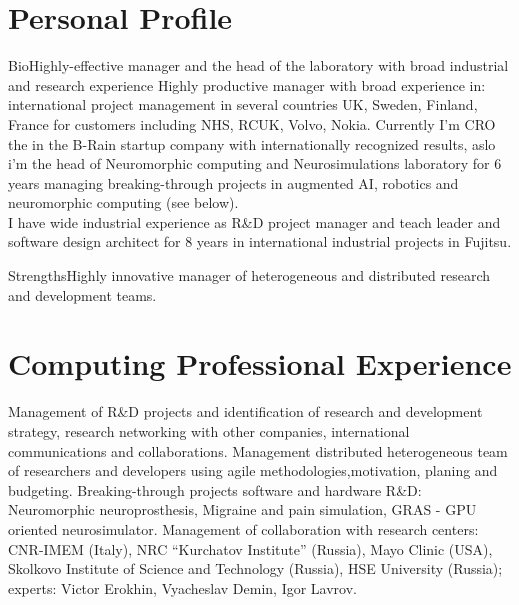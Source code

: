 \documentclass{moderncv}
\begin{document}
%
\makecvtitle

 
\section{Personal Profile}

\cventry
    {Bio}{Highly-effective manager and the head of the laboratory with broad industrial and research experience}{}{}{}
    {Highly productive manager with broad experience in: international project management in several countries UK, Sweden, Finland, France for customers including NHS, RCUK, Volvo, Nokia.
      Currently I'm CRO the in the B-Rain startup company with internationally recognized results, aslo i'm the head of  Neuromorphic computing and Neurosimulations laboratory for 6 years managing breaking-through projects in augmented AI, robotics and neuromorphic computing (see below).\\
      I have wide industrial experience as R\&D project manager and teach leader and software design architect for 8 years in international industrial projects in Fujitsu.}

\cvitem
    {Strengths}{\small Highly innovative manager of heterogeneous and distributed research and development teams.}

\section{Computing Professional Experience}

        {Management of R\&D projects and identification of research and development strategy, research networking with other companies, international communications and collaborations. Management distributed heterogeneous team of researchers and developers using agile methodologies,motivation, planing and budgeting.
          Breaking-through projects software and hardware R\&D: Neuromorphic neuroprosthesis, Migraine and pain simulation, GRAS - GPU oriented neurosimulator.
          Management of collaboration with research centers: CNR-IMEM (Italy), NRC ``Kurchatov Institute'' (Russia), Mayo Clinic (USA), Skolkovo Institute of Science and Technology (Russia), HSE University (Russia); experts: Victor Erokhin, Vyacheslav Demin, Igor Lavrov.}
        
\end{document}
